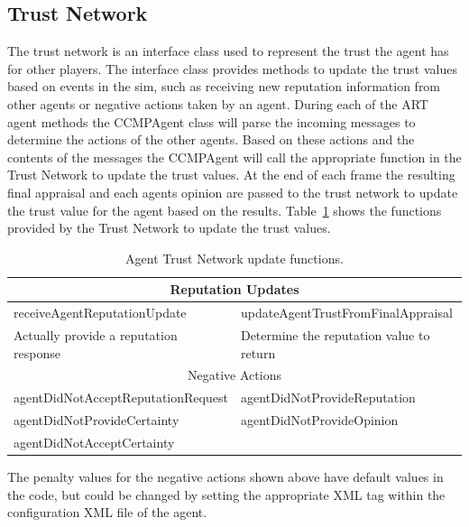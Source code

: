 \subsection{Trust Network}
The trust network is an interface class used to represent the trust the agent
has for other players.  The interface class provides methods to update the
trust values based on events in the sim, such as receiving new reputation
information from other agents or negative actions taken by an agent.  During
each of the ART agent methods the CCMPAgent class will parse the incoming
messages to determine the actions of the other agents.  Based on these actions
and the contents of the messages the CCMPAgent will call the appropriate
function in the Trust Network to update the trust values.  At the end of each
frame the resulting final appraisal and each agents opinion are passed to the trust network 
to update the trust value for the agent based on the results. Table~\ref{table:TNUpdate}
shows the functions provided by the Trust Network to update the trust values.

\begin{table}[h]
\centering
\begin{tabular}{|l|l|}
\hline
\multicolumn{2}{|c|}{Reputation Updates} \\
\hline
receiveAgentReputationUpdate & updateAgentTrustFromFinalAppraisal \\
\hline
Actually provide a reputation response & Determine the reputation value to
return \\ 
\hline
\multicolumn{2}{|c|}{Negative Actions} \\
\hline
agentDidNotAcceptReputationRequest & agentDidNotProvideReputation \\
\hline
agentDidNotProvideCertainty & agentDidNotProvideOpinion \\
\hline
agentDidNotAcceptCertainty & \\
\hline
\end{tabular}
\caption{Agent Trust Network update functions.}
\label{table:TNUpdate}
\end{table}

The penalty values for the negative actions shown above have default values in the code,
but could be changed by setting the appropriate XML tag within the configuration XML file
of the agent.

